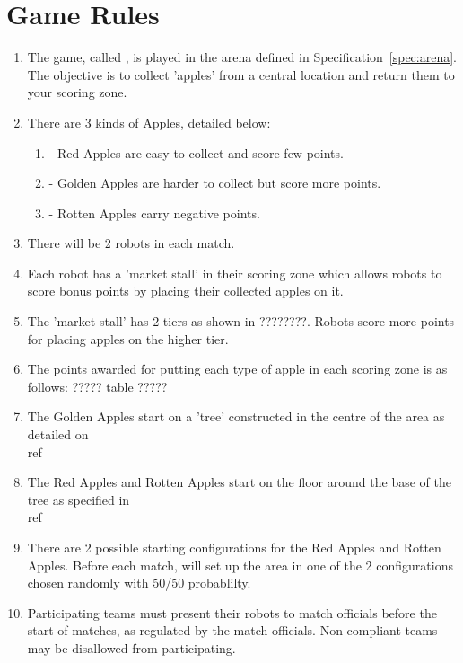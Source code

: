 \section{Game Rules}
\label{sec:rules}

\begin{enumerate}
  \item The game, called \emph{\gamename}, is played in the arena defined in
        Specification~\ref{spec:arena}. The objective is to collect 'apples' from
        a central location and return them to your scoring zone.
  \item There are 3 kinds of Apples, detailed below:
  \begin{enumerate}
      \item - Red Apples are easy to collect and score few points.
      \item - Golden Apples are harder to collect but score more points.
      \item - Rotten Apples carry negative points.            
  \end{enumerate}
  \item There will be 2 robots in each match.
  \item Each robot has a 'market stall' in their scoring zone which allows robots
        to score bonus points by placing their collected apples on it.
  \item The 'market stall' has 2 tiers as shown in ????????. Robots score
        more points for placing apples on the higher tier.
  \item The points awarded for putting each type of apple in each scoring zone is
        as follows:
        ????? table ?????
  \item The Golden Apples start on a 'tree' constructed in the centre of the area
        as detailed on \\ref{}
  \item The Red Apples and Rotten Apples start on the floor around the base of the
        tree as specified in \\ref{}
  \item There are 2 possible starting configurations for the Red Apples and Rotten Apples.
        Before each match, \staff will set up the area in one of the 2 configurations
        chosen randomly with 50/50 probablilty.
  \item Participating teams must present their robots to match officials before
        the start of matches, as regulated by the match officials. Non-compliant
        teams may be disallowed from participating.
  

\end{enumerate}
